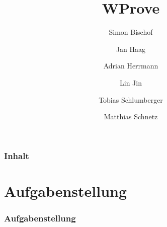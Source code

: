 \documentclass{beamer}
\author{Simon Bischof \and Jan Haag \and Adrian Herrmann \and Lin Jin \and Tobias Schlumberger \and Matthias Schnetz}
\title{WProve}
\institute{Institut f\"ur Theoretische Informatik}
\begin{document}
\begin{frame}
\maketitle
\end{frame}

\begin{frame}
\frametitle{Inhalt}
\tableofcontents
\end{frame}

\section{Aufgabenstellung}
\begin{frame}
\frametitle{Aufgabenstellung}
\end{frame}
\end{document}
